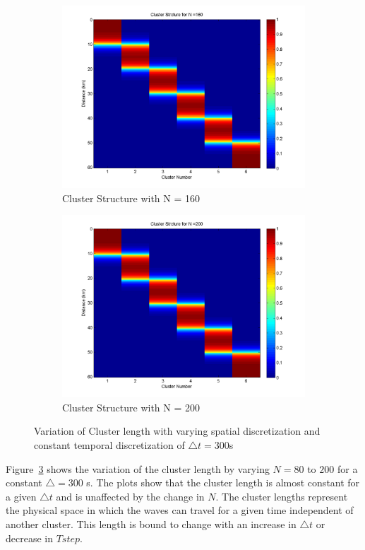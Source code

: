 \begin{figure}[H]
\begin{subfigure}[b]{0.4\textwidth}
\includegraphics[width=\textwidth]{figures_2/fig_cluster_322_60_300}
\caption{Cluster Structure with N = 160}
\label{clust_N_160}
\end{subfigure}   
\begin{subfigure}[b]{0.4\textwidth}
\centering
\includegraphics[width=\textwidth]{figures_2/fig_cluster_402_60_300}
\caption{Cluster Structure with N = 200}
\label{clust_N_200}
\end{subfigure}
\caption{Variation of Cluster length with varying spatial discretization and constant temporal discretization of $\bigtriangleup t = 300$s}
\label{clustlength_1}
\end{figure}

Figure~\ref{clustlength_1} shows the variation of the cluster length by varying $N = 80$ to $200$ for a constant $\bigtriangleup = 300$ s. The plots show that the cluster length is almost constant for a given $\bigtriangleup t$ and is unaffected by the change in $N$. The cluster lengths represent the physical space in which the waves can travel for a given time independent of another cluster.  This length is bound to change with an increase in $\bigtriangleup t$ or decrease in  $Tstep$.  

